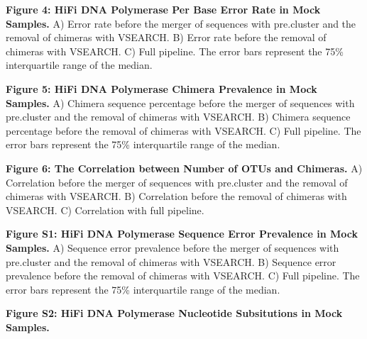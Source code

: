 \documentclass[12pt,]{article}
\begin{document}
\textbf{Figure 4: HiFi DNA Polymerase Per Base Error Rate in Mock
Samples.} A) Error rate before the merger of sequences with pre.cluster
and the removal of chimeras with VSEARCH. B) Error rate before the
removal of chimeras with VSEARCH. C) Full pipeline. The error bars
represent the 75\% interquartile range of the median.

\textbf{Figure 5: HiFi DNA Polymerase Chimera Prevalence in Mock
Samples.} A) Chimera sequence percentage before the merger of sequences
with pre.cluster and the removal of chimeras with VSEARCH. B) Chimera
sequence percentage before the removal of chimeras with VSEARCH. C) Full
pipeline. The error bars represent the 75\% interquartile range of the
median.

\textbf{Figure 6: The Correlation between Number of OTUs and Chimeras.}
A) Correlation before the merger of sequences with pre.cluster and the
removal of chimeras with VSEARCH. B) Correlation before the removal of
chimeras with VSEARCH. C) Correlation with full pipeline.

\newpage

\textbf{Figure S1: HiFi DNA Polymerase Sequence Error Prevalence in Mock
Samples.} A) Sequence error prevalence before the merger of sequences
with pre.cluster and the removal of chimeras with VSEARCH. B) Sequence
error prevalence before the removal of chimeras with VSEARCH. C) Full
pipeline. The error bars represent the 75\% interquartile range of the
median.

\textbf{Figure S2: HiFi DNA Polymerase Nucleotide Subsitutions in Mock
Samples.}
\end{document}
